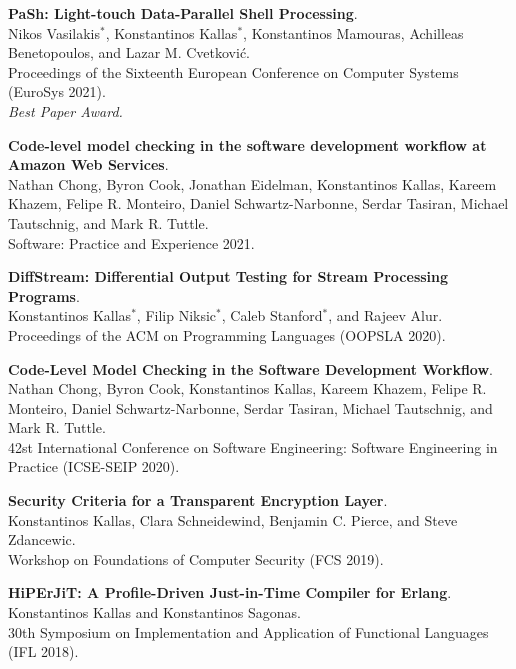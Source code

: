 \begin{minipage}{\textwidth}
\textbf{PaSh: Light-touch Data-Parallel Shell Processing}. \\
Nikos Vasilakis$^*$, Konstantinos Kallas$^*$, Konstantinos Mamouras, Achilleas Benetopoulos, and Lazar M. Cvetković. \\
Proceedings of the Sixteenth European Conference on Computer Systems (EuroSys 2021).\\
 \emph{Best Paper Award.}
\end{minipage}

\begin{minipage}{\textwidth}
\textbf{Code-level model checking in the software development workflow at Amazon Web Services}. \\
Nathan Chong, Byron Cook, Jonathan Eidelman, Konstantinos Kallas, Kareem Khazem, Felipe R. Monteiro, Daniel Schwartz-Narbonne, Serdar Tasiran, Michael Tautschnig, and Mark R. Tuttle. \\
Software: Practice and Experience 2021.
\end{minipage}

\begin{minipage}{\textwidth}
\textbf{DiffStream: Differential Output Testing for Stream Processing Programs}. \\
Konstantinos Kallas$^*$, Filip Niksic$^*$, Caleb Stanford$^*$, and Rajeev Alur. \\
Proceedings of the ACM on Programming Languages (OOPSLA 2020).
\end{minipage}

\begin{minipage}{\textwidth}
\textbf{Code-Level Model Checking in the Software Development Workflow}. \\
Nathan Chong, Byron Cook, Konstantinos Kallas, Kareem Khazem, Felipe R. Monteiro, Daniel Schwartz-Narbonne, Serdar Tasiran, Michael Tautschnig, and Mark R. Tuttle. \\
42st International Conference on Software Engineering: Software Engineering in Practice (ICSE-SEIP 2020).
\end{minipage}

\begin{minipage}{\textwidth}
\textbf{Security Criteria for a Transparent Encryption Layer}. \\
Konstantinos Kallas, Clara Schneidewind, Benjamin C. Pierce, and Steve Zdancewic. \\
Workshop on Foundations of Computer Security (FCS 2019).
\end{minipage}

\begin{minipage}{\textwidth}
\textbf{HiPErJiT: A Profile-Driven Just-in-Time Compiler for Erlang}. \\
Konstantinos Kallas and Konstantinos Sagonas. \\
30th Symposium on Implementation and Application of Functional Languages (IFL 2018).
\end{minipage}


